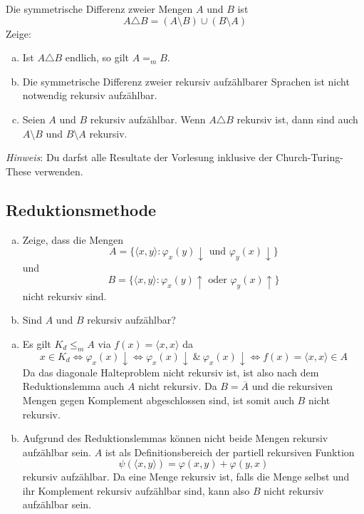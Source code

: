 \documentclass[german,headsepline]{scrartcl}
\theoremstyle{definition}
\begin{document}
	\begin{question}
		Die symmetrische Differenz zweier Mengen $A$ und $B$ ist
		\[A\triangle B=(A\setminus B)\cup(B\setminus A)\]
		Zeige:
		\begin{enumerate}[(a)]
			\item Ist $A\triangle B$ endlich, so gilt $A=_mB$.
			\item Die symmetrische Differenz zweier rekursiv aufzählbarer Sprachen ist nicht notwendig rekursiv aufzählbar.
			\item Seien $A$ und $B$ rekursiv aufzählbar.
			Wenn $A\triangle B$ rekursiv ist, dann sind auch $A\setminus B$ und $B\setminus A$ rekursiv.
		\end{enumerate}
		\textit{Hinweis}: Du darfst alle Resultate der Vorlesung inklusive der Church-Turing-These verwenden.
	\end{question}
	
	\subsection{Reduktionsmethode}
	\begin{question}[subtitle={Nachklausur 2012}]
		\begin{enumerate}[(a)]
			\item Zeige, dass die Mengen
			\[A=\{\langle x,y\rangle\colon\varphi_x(y)\downarrow\text{ und }\varphi_y(x)\downarrow\}\]
			und
			\[B=\{\langle x,y\rangle\colon\varphi_x(y)\uparrow\text{ oder }\varphi_y(x)\uparrow\}\]
			nicht rekursiv sind.
			\item Sind $A$ und $B$ rekursiv aufzählbar?
		\end{enumerate}
	\end{question}
	\begin{solution}
		\begin{enumerate}[(a)]
			\item Es gilt $K_d\leq_m A$ via $f(x)=\langle x,x\rangle$ da
			\[x\in K_d\Leftrightarrow\varphi_x(x)\downarrow\Leftrightarrow
			\varphi_x(x)\downarrow~\&~\varphi_x(x)\downarrow\Leftrightarrow
			f(x)=\langle x,x\rangle\in A\]
			Da das diagonale Halteproblem nicht rekursiv ist,
			ist also nach dem Reduktionslemma auch $A$ nicht rekursiv.
			Da $B=\overline{A}$ und die rekursiven Mengen gegen Komplement abgeschlossen sind,
			ist somit auch $B$ nicht rekursiv.
			\item Aufgrund des Reduktionslemmas können nicht beide Mengen rekursiv aufzählbar sein.
			$A$ ist als Definitionsbereich der partiell rekursiven Funktion
			\[\psi(\langle x,y\rangle)=\varphi(x,y)+\varphi(y,x)\]
			rekursiv aufzählbar.
			Da eine Menge rekursiv ist, falls die Menge selbst und ihr Komplement rekursiv aufzählbar sind,
			kann also $B$ nicht rekursiv aufzählbar sein.
		\end{enumerate}
	\end{solution}
	
\end{document}
